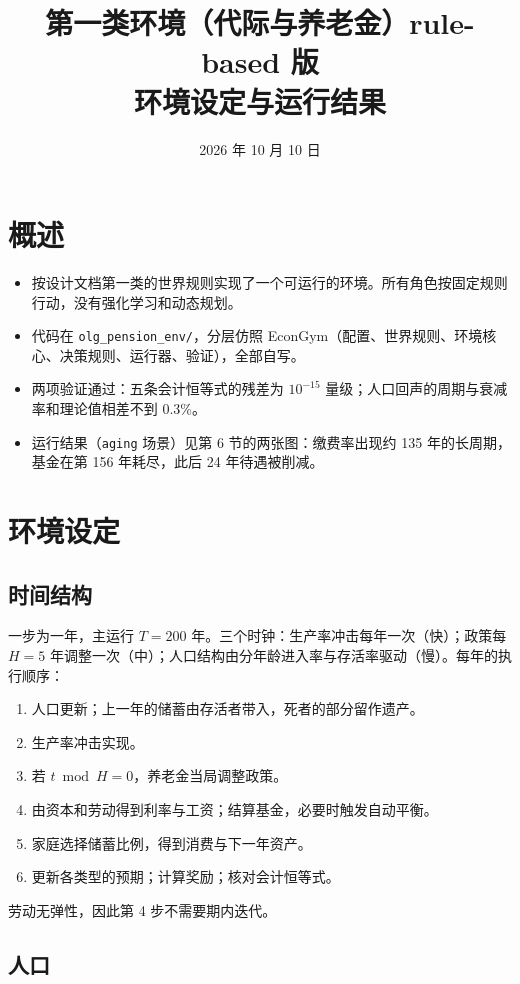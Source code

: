 \documentclass[UTF8,11pt,a4paper]{ctexart}
\title{第一类环境（代际与养老金）rule-based 版\\ \large 环境设定与运行结果}
\author{}
\date{2026 年 10 月 10 日}
\begin{document}
\maketitle

\section{概述}

\begin{itemize}
  \item 按设计文档第一类的世界规则实现了一个可运行的环境。所有角色按固定规则行动，没有强化学习和动态规划。
  \item 代码在 \texttt{olg\_pension\_env/}，分层仿照 EconGym（配置、世界规则、环境核心、决策规则、运行器、验证），全部自写。
  \item 两项验证通过：五条会计恒等式的残差为 $10^{-15}$ 量级；人口回声的周期与衰减率和理论值相差不到 0.3\%。
  \item 运行结果（\texttt{aging} 场景）见第 6 节的两张图：缴费率出现约 135 年的长周期，基金在第 156 年耗尽，此后 24 年待遇被削减。
\end{itemize}

\section{环境设定}

\subsection{时间结构}

一步为一年，主运行 $T=200$ 年。三个时钟：生产率冲击每年一次（快）；政策每 $H=5$ 年调整一次（中）；人口结构由分年龄进入率与存活率驱动（慢）。每年的执行顺序：
\begin{enumerate}
  \item 人口更新；上一年的储蓄由存活者带入，死者的部分留作遗产。
  \item 生产率冲击实现。
  \item 若 $t \bmod H = 0$，养老金当局调整政策。
  \item 由资本和劳动得到利率与工资；结算基金，必要时触发自动平衡。
  \item 家庭选择储蓄比例，得到消费与下一年资产。
  \item 更新各类型的预期；计算奖励；核对会计恒等式。
\end{enumerate}
劳动无弹性，因此第 4 步不需要期内迭代。

\subsection{人口}
\end{document}
